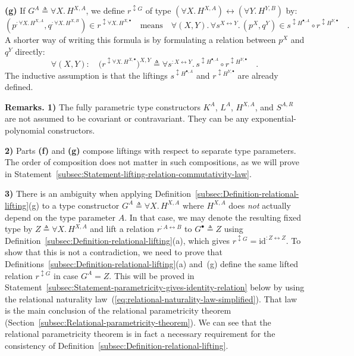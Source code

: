 \textbf{(g)} If $G^{A}\triangleq\forall X.\,H^{X,A}$, we define $r^{\updownarrow G}$
of type $(\forall X.\,H^{X,A})\leftrightarrow(\forall Y.\,H^{Y,B})$
by:
\[
(p^{:\forall X.\,H^{X,A}},q^{:\forall X.\,H^{X,B}})\in r^{\updownarrow\forall X.\,H^{X,\bullet}}\quad\text{means}\quad\forall(X,Y).\,\forall s^{X\leftrightarrow Y}.\,(p^{X},q^{Y})\in s^{\updownarrow H^{\bullet,A}}\circ r^{\updownarrow H^{Y,\bullet}}\quad.
\]
A shorter way of writing this formula is by formulating a relation
between $p^{X}$ and $q^{Y}$ directly:
\begin{equation}
\forall(X,Y):\quad\big(r^{\updownarrow\forall X.\,H^{X,\bullet}}\big)^{X,Y}\triangleq\forall s^{:X\leftrightarrow Y}.\,s^{\updownarrow H^{\bullet,A}}\circ r^{\updownarrow H^{Y,\bullet}}\quad.\label{eq:relational-lifting-quantified-types-short}
\end{equation}
The inductive assumption is that the liftings $s^{\updownarrow H^{\bullet,A}}$
and $r^{\updownarrow H^{Y,\bullet}}$ are already defined.

\textbf{Remarks. 1)} The fully parametric type constructors $K^{A}$,
$L^{A}$, $H^{X,A}$, and $S^{A,R}$ are not assumed to be covariant
or contravariant. They can be any exponential-polynomial constructors.

\textbf{2)} Parts \textbf{(f)} and \textbf{(g)} compose liftings with
respect to separate type parameters. The order of composition does
not matter in such compositions, as we will prove in Statement~\ref{subsec:Statement-lifting-relation-commutativity-law}. 

\textbf{3)} There is an ambiguity when applying Definition~\ref{subsec:Definition-relational-lifting}(g)
to a type constructor $G^{A}\triangleq\forall X.\,H^{X,A}$ where
$H^{X,A}$ does \emph{not} actually depend on the type parameter $A$.
In that case, we may denote the resulting fixed type by $Z\triangleq\forall X.\,H^{X,A}$
and lift a relation $r^{:A\leftrightarrow B}$ to $G^{\bullet}\triangleq Z$
using Definition~\ref{subsec:Definition-relational-lifting}(a),
which gives $r^{\updownarrow G}=\text{id}^{:Z\leftrightarrow Z}$.
To show that this is not a contradiction, we need to prove that Definitions~\ref{subsec:Definition-relational-lifting}(a)
and~(g) define the same lifted relation $r^{\updownarrow G}$ in
case $G^{A}=Z$. This will be proved in Statement~\ref{subsec:Statement-parametricity-gives-identity-relation}
below by using the relational naturality law~(\ref{eq:relational-naturality-law-simplified}).
That law is the main conclusion of the relational parametricity theorem
(Section~\ref{subsec:Relational-parametricity-theorem}). We can
see that the relational parametricity theorem is in fact a necessary
requirement for the consistency of Definition~\ref{subsec:Definition-relational-lifting}.

